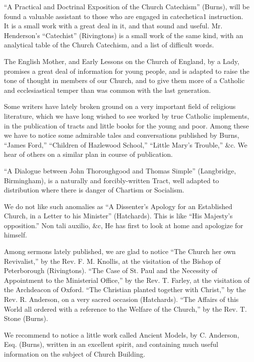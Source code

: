 ``A Practical and Doctrinal Exposition of the Church
Catechism'' (Burns), will be found a valuable assistant to those who are
engaged in catechetica1 instruction. It is a small work with a great
deal in it, and that sound and useful. Mr. Henderson's ``Catechist''
(Rivingtons) is a small work of the same kind, with an analytical table
of the Church Catechism, and a list of difficult words.

The English Mother, and Early Lessons on the Church
of England, by a Lady, promises a great deal of information for young
people, and is adapted to raise the tone of thought in members of our
Church, and to give them more of a Catholic and ecclesiastical temper
than was common with the last generation.

Some writers have lately broken ground on a very
important field of religious literature, which we have long wished to
see worked by true Catholic implements, in the publication of tracts and
little books for the young and poor. Among these we have to notice some
admirable tales and conversations published by Burns, ``James Ford,'' ``Children
of Hazlewood School,'' ``Little Mary's Trouble,'' \&c. We hear of others
on a similar plan in course of publication.

``A Dialogue between John Thoroughgood and Thomas
Simple'' (Langbridge, Birmingham), is a naturally and forcibly-written
Tract, well adapted to distribution where there is danger of Chartism or
Socialism.

We do not like such anomalies as ``A Dissenter's
Apology for an Established Church, in a Letter to his Minister'' (Hatchards).
This is like ``His Majesty's opposition.'' Non tali auxilio, \&c, He
has first to look at home and apologize for himself.

Among sermons lately published, we are glad to
notice ``The Church her own Revivalist,'' by the Rev. F. M. Knollis, at
the visitation of the Bishop of Peterborough (Rivingtons). ``The Case of
St. Paul and the Necessity of Appointment to the Ministerial Office,'' by
the Rev. T. Farley, at the visitation of the Archdeacon of Oxford. ``The
Christian planted together with Christ,'' by the Rev. R. Anderson, on a
very sacred occasion (Hatchards). ``The Affairs of this World all ordered
with a reference to the Welfare of the Church,'' by the Rev. T. Stone
(Burns).

We recommend to notice a little work called Ancient
Models, by C. Anderson, Esq. (Burns), written in an excellent spirit,
and containing much useful information on the subject of Church
Building.

